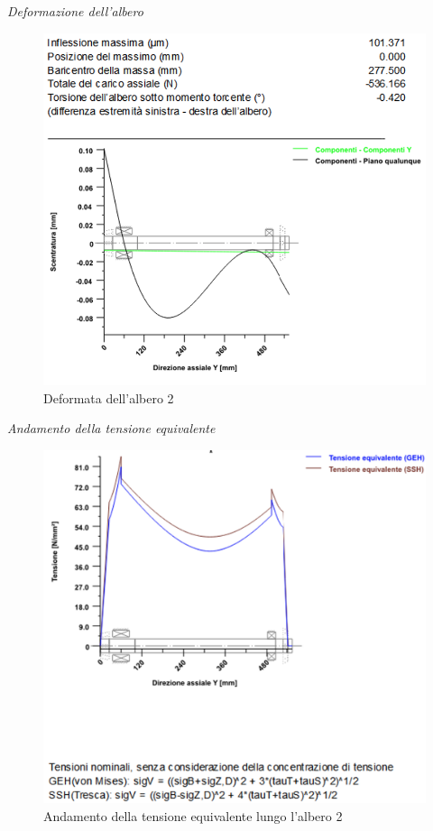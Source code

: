 \emph{Deformazione dell'albero}
\begin{figure}[h]
    \centering
    \includegraphics[scale=0.45]{Immagini/DeformataAlbero2.png}
    \caption{Deformata dell'albero 2}
    \label{fig:Deformata albero 2}
\end{figure}
\newpage
\emph{Andamento della tensione equivalente}
\begin{figure}[h]
    \centering
    \includegraphics[scale=0.5]{Immagini/TensioniAlbero2.png}
    \caption{Andamento della tensione equivalente lungo l'albero 2}
    \label{fig:TensioniAlbero2}
\end{figure}

